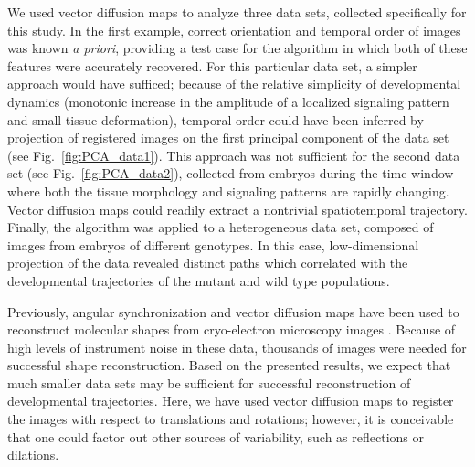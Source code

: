 \documentclass{pnastwo}
\newcommand{\fig}[0]{Fig.}
\begin{document}
\begin{article}
We used vector diffusion maps to analyze three data sets, collected specifically for this study. 
%
In the first example, correct orientation and temporal order of images was known {\it a priori}, providing a test case for the algorithm in which both of these features were accurately recovered. 
%
For this particular data set, a simpler approach would have sufficed;
because of the relative simplicity of developmental dynamics (monotonic increase in the amplitude of a localized signaling pattern and small tissue deformation), temporal order could have been inferred by projection of registered images on the first principal component of the data set (see \fig~\ref{fig:PCA_data1}). 
%
This approach was not sufficient for the second data set (see \fig~\ref{fig:PCA_data2}), collected from embryos during the time window where both the tissue morphology and signaling patterns are rapidly changing.  
%
Vector diffusion maps could readily extract a nontrivial spatiotemporal trajectory. 
%
Finally, the algorithm was applied to a heterogeneous data set, composed of images from embryos of different genotypes. 
%
In this case, low-dimensional projection of the data revealed distinct paths which correlated with the developmental trajectories of the mutant and wild type populations. 

Previously, angular synchronization and vector diffusion maps have been used to reconstruct molecular shapes from cryo-electron microscopy images \cite{singer2012vector, zhao2014rotationally, singer2011viewing}.
%
Because of high levels of instrument noise in these data, thousands of images were needed for successful shape reconstruction. 
%
Based on the presented results, we expect that much smaller data sets may be sufficient for successful reconstruction of developmental trajectories. 
%
Here, we have used vector diffusion maps to register the images with respect to translations and rotations; however, it is conceivable that one could factor out other sources of variability, such as reflections \cite{singer2012vector, goemans1995improved, bandeira2013cheeger} or dilations.
%
%


\end{article}
\end{document}
